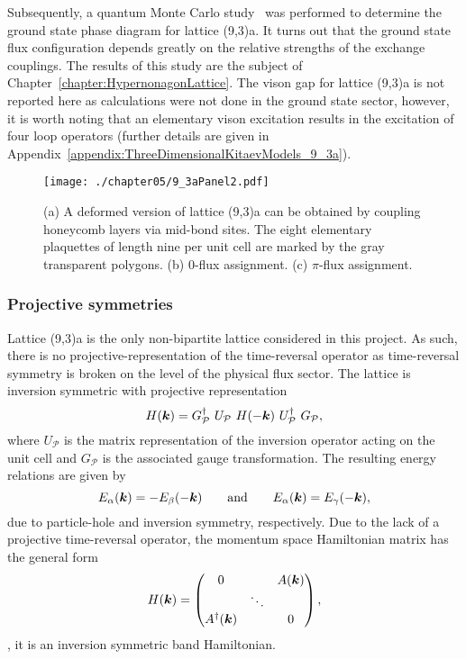 Subsequently, a quantum Monte Carlo study~\cite{MischenkoPRB2019} was performed to determine the ground state phase diagram for lattice (9,3)a.
It turns out that the ground state flux configuration depends greatly on the relative strengths of the exchange couplings.
The results of this study are the subject of Chapter~\ref{chapter:HypernonagonLattice}.
The vison gap for lattice (9,3)a is not reported here as calculations were not done in the ground state sector, however, it is worth noting that an elementary vison excitation results in the excitation of four loop operators (further details are given in Appendix~\ref{appendix:ThreeDimensionalKitaevModels_9_3a}).
%
\begin{figure}[tb]
	\centering
	\texttt{[image: ./chapter05/9\_3aPanel2.pdf]}
	\caption{
		(a) A deformed version of lattice (9,3)a can be obtained by coupling honeycomb layers via mid-bond sites.
		The eight elementary plaquettes of length nine per unit cell are marked by the gray transparent polygons.
		(b) $0$-flux assignment.
		(c) $\pi$-flux assignment.
	}
	\label{fig:chapter05_9_3aPanel2}
\end{figure}
%


%
%
\subsubsection{Projective symmetries}
%
%
Lattice (9,3)a is the only non-bipartite lattice considered in this project.
As such, there is no projective-representation of the time-reversal operator as time-reversal symmetry is broken on the level of the physical flux sector.
The lattice is inversion symmetric with projective representation
%
\begin{equation}
	H(\bm{k}) = G^{\dagger}_{\mathcal{P}}~U_{\mathcal{P}}~H(-\bm{k})~U^{\dagger}_{\mathcal{P}}~G_{\mathcal{P}},
\end{equation}
%
where $U_{\mathcal{P}}$ is the matrix representation of the inversion operator acting on the unit cell and $G_\mathcal{P}$ is the associated gauge transformation.
The resulting energy relations are given by
%
\begin{equation}
	E_{\alpha}(\bm{k}) = -E_{\beta}(-\bm{k}) \qquad {\rm and } \qquad E_{\alpha}(\bm{k}) = E_{\gamma}(-\bm{k}),
\end{equation}
%
due to particle-hole and inversion symmetry, respectively.
Due to the lack of a projective time-reversal operator, the momentum space Hamiltonian matrix has the general form
%
\begin{equation}
	H(\bm{k}) =
		\begin{pmatrix}
			0			&	&	A(\bm{k}) \\
						& \ddots & \\
			A^{\dagger}(\bm{k})	&		 & 0
		\end{pmatrix},
\end{equation}
%
\ie, it is an inversion symmetric band Hamiltonian.


